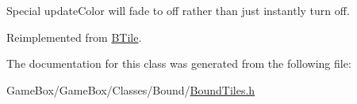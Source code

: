\-Special update\-Color will fade to off rather than just instantly turn off. 



\-Reimplemented from \hyperlink{class_b_tile_af9d81dcd02de972c1d451af63c0a48e5}{\-B\-Tile}.



\-The documentation for this class was generated from the following file\-:\begin{DoxyCompactItemize}
\item 
\-Game\-Box/\-Game\-Box/\-Classes/\-Bound/\hyperlink{_bound_tiles_8h}{\-Bound\-Tiles.\-h}\end{DoxyCompactItemize}
